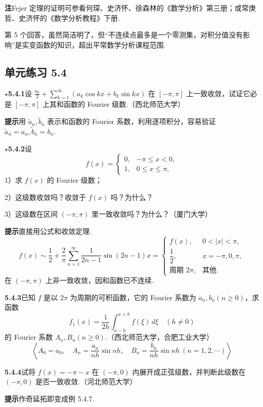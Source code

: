 \documentclass[UTF8,12pt,a4paper,fontset=fandol]{ctexart}
\begin{document}
\noindent\textbf{注}\quad Fejer 定理的证明可参看何琛、史济怀、徐森林的《数学分析》第三册；或常庚哲、史济怀的《数学分析教程》下册.

第 5 个回答，虽然简洁明了，但“不连续点最多是一个零测集，对积分值没有影响”是实变函数的知识，超出平常数学分析课程范围.

\subsection*{单元练习 5.4}

\noindent\(\star\)\textbf{5.4.1}\quad 设
$\displaystyle\frac{a_0}{2}+\sum_{k=1}^{\infty}(a_k\cos kx+b_k\sin kx)$
在 $[-\pi,\pi]$ 上一致收敛，试证它必是 $[-\pi,\pi]$ 上其和函数的 Fourier 级数.（西北师范大学）

\noindent\textbf{提示}\quad 用 $\tilde a_n,\tilde b_n$ 表示和函数的 Fourier 系数，利用逐项积分，容易验证
$\tilde a_n=a_n,\tilde b_n=b_n$.

\noindent\(\star\)\textbf{5.4.2}\quad 设
\[
  f(x)=
  \begin{cases}
  0,&-\pi\le x<0,\\
  1,&0\le x\le\pi,
  \end{cases}
\]
1）求 $f(x)$ 的 Fourier 级数；

2）这级数收敛吗？收敛于 $f(x)$ 吗？为什么？

3）这级数在区间 $(-\pi,\pi)$ 里一致收敛吗？为什么？（厦门大学）

\noindent\textbf{提示}\quad 直接用公式和收敛定理.
\[
  f(x)\sim\frac12+\frac2\pi\sum_{n=1}^{\infty}\frac1{2n-1}\sin(2n-1)x
  =
  \begin{cases}
  f(x),&0<|x|<\pi,\\
  \dfrac12,&x=-\pi,0,\pi,\\
  \text{周期 }2\pi,&\text{其他}.
  \end{cases}
\]
在 $(-\pi,\pi)$ 上非一致收敛，因和函数已不连续.

\noindent\textbf{5.4.3}\quad 已知 $f$ 是以 $2\pi$ 为周期的可积函数，它的 Fourier 系数为 $a_n,b_n(n\ge0)$，求函数
\[
  f_1(x)=\frac1{2h}\int_{x-h}^{x+h}f(\xi)\,d\xi\quad(h\ne0)
\]
的 Fourier 系数 $A_n,B_n(n\ge0)$.（西北师范大学，合肥工业大学）
\[
  \left\langle A_0=a_0,\quad A_n=\frac{a_n}{nh}\sin nh,\quad
  B_n=\frac{b_n}{nh}\sin nh\ (n=1,2,\cdots)\right\rangle
\]

\noindent\textbf{5.4.4}\quad 试将 $f(x)=-\pi-x$ 在 $(-\pi,0)$ 内展开成正弦级数，并判断此级数在 $(-\pi,0)$ 是否一致收敛.（河北师范大学）

\noindent\textbf{提示}\quad 作奇延拓即变成例 5.4.7.
\end{document}
